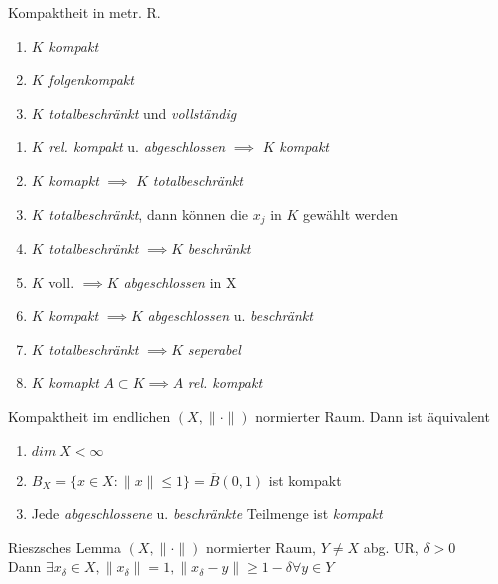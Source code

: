 \begin{satz}{Kompaktheit in metr. R.}
  \begin{enumerate}[label = $\Leftrightarrow$]
    \item $K$ \textit{kompakt}
    \item $K$ \textit{folgenkompakt}
    \item $K$ \textit{totalbeschränkt} und \textit{vollständig}
  \end{enumerate}
\end{satz}

\begin{bemerkung}
  \begin{enumerate}[label=(\roman*)]
    \item $K$ \textit{rel. kompakt} u. \textit{abgeschlossen}
      $\implies$ $K$ \textit{kompakt}
    \item $K$ \textit{komapkt} $\implies$ $K$ \textit{totalbeschränkt}
    \item $K$ \textit{totalbeschränkt}, dann können die $x_j$ in $K$
      gewählt werden
    \item $K$ \textit{totalbeschränkt} $\implies K$ \textit{beschränkt}
    \item $K$ voll. $\implies K$ \textit{abgeschlossen} in X
    \item $K$ \textit{kompakt} $\implies K$ \textit{abgeschlossen} u.
      \textit{beschränkt}
    \item $K$ \textit{totalbeschränkt} $\implies K$
      \textit{seperabel}
    \item $K$ \textit{komapkt} $A \subset K \implies A$ \textit{rel. kompakt}
  \end{enumerate}
\end{bemerkung}

\begin{satz}{Kompaktheit im endlichen}
  $(X, \|\cdot\|)$ normierter Raum. Dann ist äquivalent
  \begin{enumerate}[label = (\roman*)]
    \item $dim\ X < \infty$
    \item $B_X = \{x\in X: \|x\| \leq 1\} = \overline{B}(0,1)$ ist kompakt
    \item Jede \textit{abgeschlossene} u. \textit{beschränkte} Teilmenge ist
      \textit{kompakt}
  \end{enumerate}
\end{satz}

\begin{satz}{Rieszsches Lemma}
  $(X, \|\cdot\|)$ normierter Raum, $Y \neq X$ abg. UR, $\delta>0$\\
  Dann $\exists x_{\delta} \in X, \|x_{\delta}\| = 1,  \|x_{\delta}-y\|
  \geq 1-\delta \forall y \in Y$
\end{satz}


